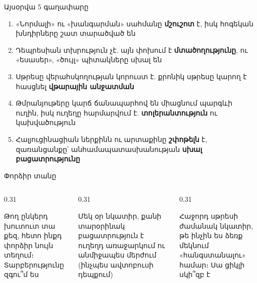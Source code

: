 \notopic

\begin{frame}{Այսօրվա 5 գաղափարը}
  \begin{enumerate}
    \item<1-> «Նորմալի» ու «խանգարման» սահմանը \textbf{մշուշոտ} է, իսկ հոգեկան խնդիրները շատ տարածված են
    \item<2-> Դեպրեսիան տխրություն չէ. այն փոխում է \textbf{մտածողությունը}, ու «եսասեր», «ծույլ» պիտակները սխալ են
    \item<3-> Սթրեսը վերահսկողության կորուստ է. քրոնիկ սթրեսը կարող է հասցնել \textbf{վթարային անջատման}
    \item<4-> Թմրանյութերը կարճ ճանապարհով են միացնում պարգևի ուղին, իսկ ուղեղը հարմարվում է. \textbf{տոլերանտություն} ու կախվածություն
    \item<5-> Հալյուցինացիան ներքինն ու արտաքինը \textbf{շփոթելն} է, զառանցանքը՝ անհամապատասխանության \textbf{սխալ բացատրությունը}
  \end{enumerate}
\end{frame}

\begin{frame}{Փորձիր տանը}
  \begin{columns}[T]
    \begin{column}{0.31\textwidth}
      \begin{card}[colback=mint!30!cardwhite]
        \centering{}\par\smallskip
        \raggedright Թող ընկերդ խուտուտ տա քեզ, հետո ինքդ փորձիր նույն տեղում։ Տարբերությունը զգու՞մ ես
      \end{card}
    \end{column}
    \begin{column}{0.31\textwidth}
      \begin{card}[colback=lavender!35!cardwhite]
        \centering{}\par\smallskip
        \raggedright Մեկ օր նկատիր, քանի տարօրինակ բացատրություն է ուղեղդ առաջարկում ու անմիջապես մերժում (ինչպես ավտոբուսի դեպքում)
      \end{card}
    \end{column}
    \begin{column}{0.31\textwidth}
      \begin{card}[colback=peach!35!cardwhite]
        \centering{}\par\smallskip
        \raggedright Հաջորդ սթրեսի ժամանակ նկատիր, թե ինչին ես ձեռք մեկնում «հանգստանալու» համար։ Սա ցիկլի սկի՞զբ է
      \end{card}
    \end{column}
  \end{columns}
\end{frame}

